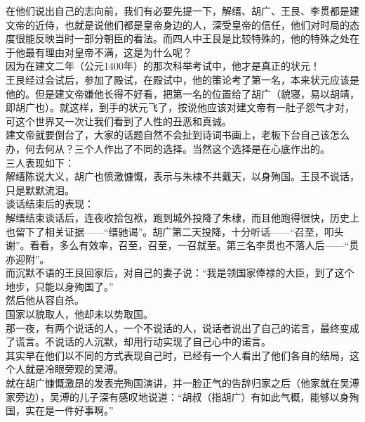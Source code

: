 \begin{multicols}{\theparacolNo}
在他们说出自己的志向前，我们有必要先提一下，解缙、胡广、王艮、李贯都是建文帝的近侍，也就是说他们都是皇帝身边的人，深受皇帝的信任，他们对时局的态度很能反映当时一部分朝臣的看法。而四人中王艮是比较特殊的，他的特殊之处在于他最有理由对皇帝不满，这是为什么呢？\\

因为在建文二年（公元1400年）的那次科举考试中，他才是真正的状元！\\

王艮经过会试后，参加了殿试，在殿试中，他的策论考了第一名，本来状元应该是他的。但是建文帝嫌他长得不好看，把第一名的位置给了胡广（貌寝，易以胡靖，即胡广也）。就这样，到手的状元飞了，按说他应该对建文帝有一肚子怨气才对，可这个世界又一次让我们看到了人性的丑恶和真诚。\\

建文帝就要倒台了，大家的话题自然不会扯到诗词书画上，老板下台自己该怎么办，何去何从？三个人作出了不同的选择。当然这个选择是在心底作出的。\\

三人表现如下：\\

解缙陈说大义，胡广也愤激慷慨，表示与朱棣不共戴天，以身殉国。王艮不说话，只是默默流泪。\\

谈话结束后的表现：\\

解缙结束谈话后，连夜收拾包袱，跑到城外投降了朱棣，而且他跑得很快，历史上也留下了相关证据——“缙驰谒”。胡广第二天投降，十分听话——“召至，叩头谢”。看看，多么有效率，召至，召至，一召就至。第三名李贯也不落人后——“贯亦迎附”。\\

而沉默不语的王艮回家后，对自己的妻子说：“我是领国家俸禄的大臣，到了这个地步，只能以身殉国了。”\\

然后他从容自杀。\\

国家以貌取人，他却未以势取国。\\

那一夜，有两个说话的人，一个不说话的人，说话者说出了自己的诺言，最终变成了谎言。不说话的人沉默，却用行动实现了自己心中的诺言。\\

其实早在他们以不同的方式表现自己时，已经有一个人看出了他们各自的结局，这个人就是冷眼旁观的吴溥。\\

就在胡广慷慨激昂的发表完殉国演讲，并一脸正气的告辞归家之后（他家就在吴溥家旁边），吴溥的儿子深有感叹地说道：“胡叔（指胡广）有如此气概，能够以身殉国，实在是一件好事啊。”\\


\end{multicols}
